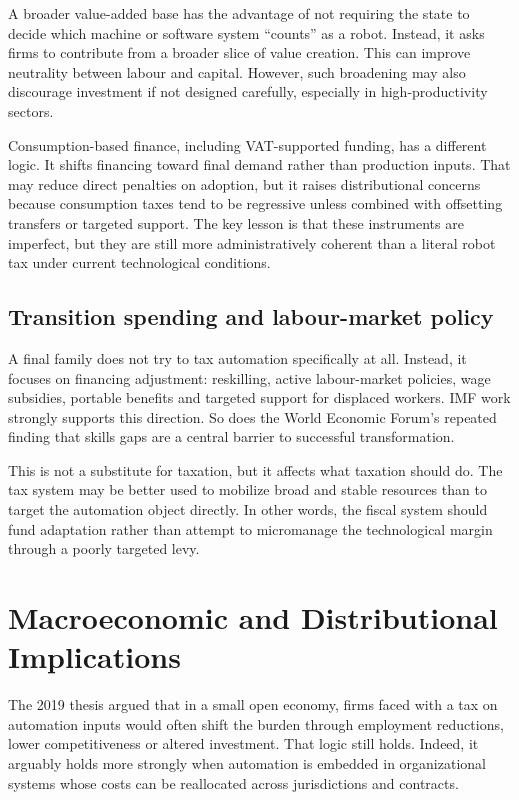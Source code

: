 \documentclass[11pt]{article}
\begin{document}
A broader value-added base has the advantage of not requiring the state to decide which machine or software system ``counts'' as a robot. Instead, it asks firms to contribute from a broader slice of value creation. This can improve neutrality between labour and capital. However, such broadening may also discourage investment if not designed carefully, especially in high-productivity sectors.

Consumption-based finance, including VAT-supported funding, has a different logic. It shifts financing toward final demand rather than production inputs. That may reduce direct penalties on adoption, but it raises distributional concerns because consumption taxes tend to be regressive unless combined with offsetting transfers or targeted support. The key lesson is that these instruments are imperfect, but they are still more administratively coherent than a literal robot tax under current technological conditions.

\subsection{Transition spending and labour-market policy}
A final family does not try to tax automation specifically at all. Instead, it focuses on financing adjustment: reskilling, active labour-market policies, wage subsidies, portable benefits and targeted support for displaced workers. IMF work strongly supports this direction. So does the World Economic Forum's repeated finding that skills gaps are a central barrier to successful transformation.

This is not a substitute for taxation, but it affects what taxation should do. The tax system may be better used to mobilize broad and stable resources than to target the automation object directly. In other words, the fiscal system should fund adaptation rather than attempt to micromanage the technological margin through a poorly targeted levy.

\section{Macroeconomic and Distributional Implications}
The 2019 thesis argued that in a small open economy, firms faced with a tax on automation inputs would often shift the burden through employment reductions, lower competitiveness or altered investment. That logic still holds. Indeed, it arguably holds more strongly when automation is embedded in organizational systems whose costs can be reallocated across jurisdictions and contracts.
\end{document}
